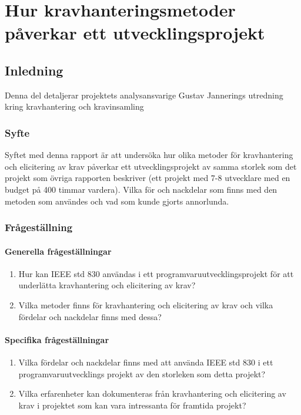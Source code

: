 \chapter{Hur kravhanteringsmetoder påverkar ett utvecklingsprojekt}
\label{cha:indiv-report-jannering}

\section{Inledning}
\label{sec:introduction-jannering}

Denna del detaljerar projektets analysansvarige Gustav Jannerings utredning kring kravhantering och kravinsamling

\subsection{Syfte}
\label{sec:purpose-jannering}


Syftet med denna rapport är att undersöka hur olika metoder för kravhantering och elicitering av krav påverkar ett utvecklingsprojekt av samma storlek som det projekt som övriga rapporten beskriver (ett projekt med 7-8 utvecklare med en budget på 400 timmar vardera). Vilka för och nackdelar som finns med den metoden som användes och vad som kunde gjorts annorlunda.

\subsection{Frågeställning}
\label{sec:issue-jannering}

\subsubsection{Generella frågeställningar}
\begin{enumerate}
	\item Hur kan IEEE std 830 användas i ett programvaruutvecklingsprojekt för att underlätta kravhantering och elicitering av krav?
	
	\item Vilka metoder finns för kravhantering och elicitering av krav och vilka fördelar och nackdelar finns med dessa? 
\end{enumerate}
\subsubsection{Specifika frågeställningar}
\begin{enumerate}
	\item Vilka fördelar och nackdelar finns med att använda IEEE std 830 i ett programvaruutvecklings projekt av den storleken som detta projekt?
	
	\item Vilka erfarenheter kan dokumenteras från kravhantering och elicitering av krav i projektet som kan vara intressanta
	för framtida projekt?
	
\end{enumerate}
